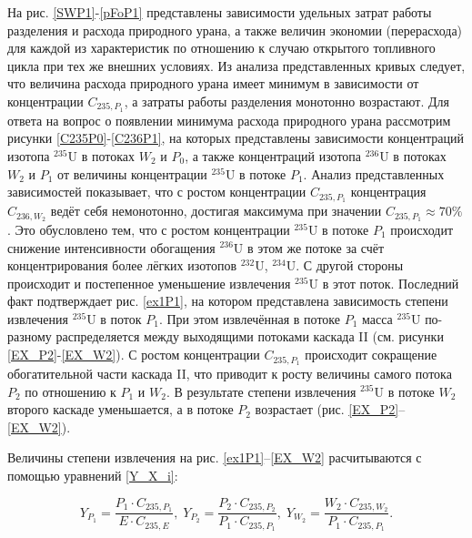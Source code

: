 {На рис. \ref{SWP1}-\ref{pFoP1} представлены зависимости удельных затрат работы разделения и расхода природного урана, а также величин экономии (перерасхода) для каждой из характеристик по отношению к случаю открытого топливного цикла при тех же внешних условиях. Из анализа представленных кривых следует, что величина расхода природного урана имеет минимум в зависимости от концентрации $C_{235,{P_1}}$, а затраты работы разделения монотонно возрастают. Для ответа на вопрос о появлении минимума расхода природного урана рассмотрим рисунки \ref{C235P0}-\ref{C236P1}, на которых представлены зависимости концентраций изотопа $^{235}$U в потоках $W_2$ и $P_0$, а также концентраций изотопа $^{236}$U в потоках $W_2$ и $P_1$ от величины концентрации $^{235}$U в потоке $P_1$. Анализ представленных зависимостей показывает, что с ростом концентрации $C_{235,{P_1}}$ концентрация $C_{236,{W_2}}$ ведёт себя немонотонно, достигая максимума при значении $C_{235,{P_1}} \approx 70\%$. Это обусловлено тем, что с ростом концентрации $^{235}$U в потоке $P_1$ происходит снижение интенсивности обогащения $^{236}$U в этом же потоке за счёт концентрирования более лёгких изотопов $^{232}$U, $^{234}$U. С другой стороны происходит и постепенное уменьшение извлечения $^{235}$U в этот поток. Последний факт подтверждает рис. \ref{ex1P1}, на котором представлена зависимость степени извлечения $^{235}$U в поток $P_1$. При этом извлечённая в потоке $P_1$ масса $^{235}$U по-разному распределяется между выходящими потоками каскада II (см. рисунки \ref{EX_P2}-\ref{EX_W2}).
С ростом концентрации $C_{235,{P_1}}$ происходит сокращение обогатительной части каскада II, что приводит к росту величины самого потока $P_2$ по отношению к $P_1$ и $W_2$.
В результате  степени извлечения $^{235}$U в потоке $W_2$ второго каскаде уменьшается, а в потоке $P_2$ возрастает (рис. \ref{EX_P2}--\ref{EX_W2}). 

Величины степени извлечения на рис. \ref{ex1P1}--\ref{EX_W2} расчитываются с помощью уравнений \ref{Y_X_i}: 

\begin{equation}\label{Y_X_i}
    Y_{P_1} = \frac{P_1 \cdot C_{235,{P_1}}}{E \cdot C_{235,{E}}} ,\; 
    Y_{P_2} = \frac{P_2 \cdot C_{235,{P_2}}}{P_1 \cdot C_{235,{P_1}}} ,\; 
    Y_{W_2} = \frac{W_2 \cdot C_{235,{W_2}}}{P_1 \cdot C_{235,{P_1}}}.
\end{equation}


}
